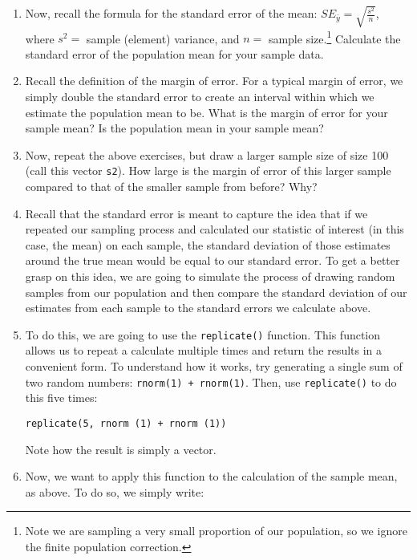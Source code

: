 \documentclass[a4paper,12pt]{article}
\begin{document}
\begin{enumerate}
\item Now, recall the formula for the standard error of the mean: $SE_{\bar{y}} = \sqrt{\frac{s^2}{n}}$, where $s^2 = $ sample (element) variance, and	$n = $ sample size.\footnote{Note we are sampling a very small proportion of our population, so we ignore the finite population correction.} Calculate the standard error of the population mean for your sample data.

\item Recall the definition of the margin of error. For a typical margin of error, we simply double the standard error to create an interval within which we estimate the population mean to be. What is the margin of error for your sample mean? Is the population mean in your sample mean?

\item Now, repeat the above exercises, but draw a larger sample size of size 100 (call this vector \texttt{s2}). How large is the margin of error of this larger sample compared to that of the smaller sample from before? Why?

\item Recall that the standard error is meant to capture the idea that if we repeated our sampling process and calculated our statistic of interest (in this case, the mean) on each sample, the standard deviation of those estimates around the true mean would be equal to our standard error. To get a better grasp on this idea, we are going to simulate the process of drawing random samples from our population and then compare the standard deviation of our estimates from each sample to the standard errors we calculate above.

\item To do this, we are going to use the \texttt{replicate()} function. This function allows us to repeat a calculate multiple times and return the results in a convenient form. To understand how it works, try generating a single sum of two random numbers: \texttt{rnorm(1) + rnorm(1)}. Then, use \texttt{replicate()} to do this five times:

\begin{verbatim}
replicate(5, rnorm (1) + rnorm (1))
\end{verbatim}

\noindent Note how the result is simply a vector.

\item Now, we want to apply this function to the calculation of the sample mean, as above. To do so, we simply write:


\end{enumerate}
\end{document}
